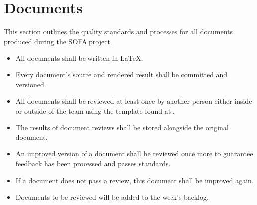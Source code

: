 \section{Documents}
This section outlines the quality standards and processes for all documents produced during the SOFA project.

\begin{itemize}
	\item All documents shall be written in LaTeX.
	\item Every document's source and rendered result shall be committed and versioned.
	\item All documents shall be reviewed at least once by another person either inside or outside of the team using the template found at .
	\item The results of document reviews shall be stored alongside the original document.
	\item An improved version of a document shall be reviewed once more to guarantee feedback has been processed and passes standards.
	\item If a document does not pass a review, this document shall be improved again.
	\item Documents to be reviewed will be added to the week's backlog.
\end{itemize}